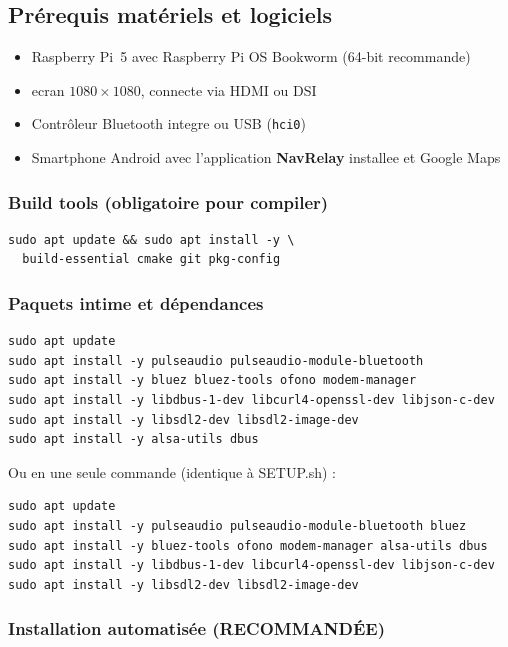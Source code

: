 \documentclass[a4paper,11pt]{article}
\begin{document}
\subsection{Prérequis matériels et logiciels}

\begin{itemize}
  \item Raspberry Pi~5 avec Raspberry Pi OS Bookworm (64-bit recommande)
  \item ecran $1080\times1080$, connecte via HDMI ou DSI
  \item Contrôleur Bluetooth integre ou USB (\texttt{hci0})
  \item Smartphone Android avec l'application \textbf{NavRelay} installee et Google Maps
\end{itemize}

\subsubsection{Build tools (obligatoire pour compiler)}

\begin{lstlisting}[style=bashcode]
sudo apt update && sudo apt install -y \
  build-essential cmake git pkg-config
\end{lstlisting}

\subsubsection{Paquets intime et dépendances}

\begin{lstlisting}[style=bashcode]
sudo apt update
sudo apt install -y pulseaudio pulseaudio-module-bluetooth
sudo apt install -y bluez bluez-tools ofono modem-manager
sudo apt install -y libdbus-1-dev libcurl4-openssl-dev libjson-c-dev
sudo apt install -y libsdl2-dev libsdl2-image-dev
sudo apt install -y alsa-utils dbus
\end{lstlisting}

Ou en une seule commande (identique à SETUP.sh) :

\begin{lstlisting}[style=bashcode]
sudo apt update
sudo apt install -y pulseaudio pulseaudio-module-bluetooth bluez
sudo apt install -y bluez-tools ofono modem-manager alsa-utils dbus
sudo apt install -y libdbus-1-dev libcurl4-openssl-dev libjson-c-dev
sudo apt install -y libsdl2-dev libsdl2-image-dev
\end{lstlisting}

\subsubsection{Installation automatisée (RECOMMANDÉE)}
\end{document}
